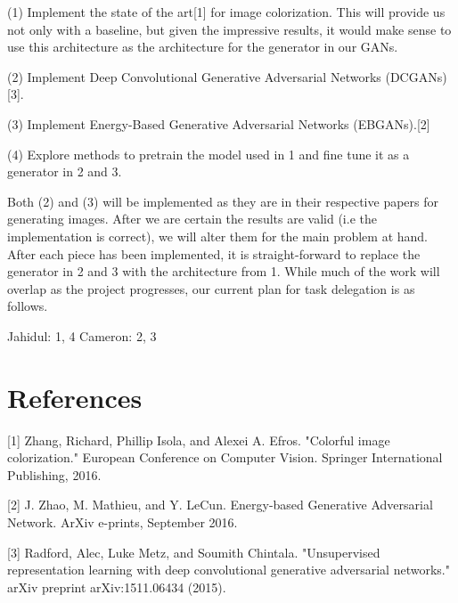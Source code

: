 \documentclass{article}
\begin{document}
\vspace{2pt}
(1) Implement the state of the art[1] for image colorization. This will provide
\indent us not only with a baseline, but given the impressive results, it would make
\indent sense to use this architecture as the architecture for the generator in our
\indent GANs.

\vspace{3pt}
(2) Implement Deep Convolutional Generative Adversarial Networks \newline
\indent (DCGANs)[3]. 

\vspace{3pt}
(3) Implement Energy-Based Generative Adversarial Networks (EBGANs).[2]

\vspace{3pt}
(4) Explore methods to pretrain the model used in 1 and fine tune it as a
\indent generator in 2 and 3.

\vspace{4pt}

\noindent Both (2) and (3) will be implemented as they are in their respective papers for generating
images. After we are certain the results are valid (i.e the implementation is correct), we will alter
them for the main problem at hand. After each piece has been implemented, it is straight-forward to
replace the generator in 2 and 3 with the architecture from 1. While much of the work will overlap as the
project progresses, our current plan for task delegation is as follows. \newline

\noindent Jahidul: 1, 4 \newline
\noindent Cameron: 2, 3


\section{References}
[1] Zhang, Richard, Phillip Isola, and Alexei A. Efros. "Colorful image colorization." 
European Conference on Computer Vision. Springer International Publishing, 2016.

[2] J. Zhao, M. Mathieu, and Y. LeCun.  Energy-based Generative Adversarial 
Network. ArXiv e-prints, September 2016.\newline

[3] Radford, Alec, Luke Metz, and Soumith Chintala. "Unsupervised representation learning with deep
convolutional generative adversarial networks." arXiv preprint arXiv:1511.06434 (2015).
\end{document}
